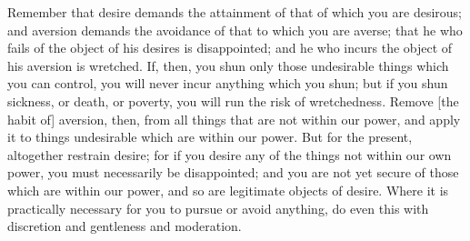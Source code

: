 Remember that desire demands the attainment  of that of which you are desirous;
and aversion demands the avoidance of that to which you are averse; that he who
fails of  the object  of his  desires is  disappointed; and  he who  incurs the
object of his  aversion is wretched. If, then, you  shun only those undesirable
things which you can control, you will never incur anything which you shun; but
if  you  shun  sickness, or  death,  or  poverty,  you  will run  the  risk  of
wretchedness. Remove  [the habit of] aversion,  then, from all things  that are
not within our power,  and apply it to things undesirable  which are within our
power. But for  the present, altogether restrain desire; for  if you desire any
of the things  not within our own power, you  must necessarily be disappointed;
and you  are not yet  secure of those  which are within  our power, and  so are
legitimate objects  of desire.  Where it  is practically  necessary for  you to
pursue  or avoid  anything, do  even this  with discretion  and gentleness  and
moderation.
